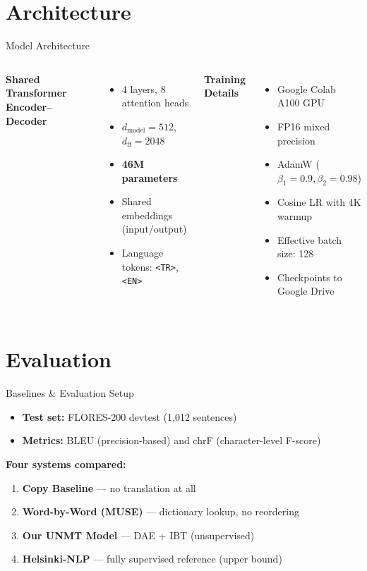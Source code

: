 \documentclass[aspectratio=169]{beamer}
\begin{document}
\section{Architecture}

\begin{frame}{Model Architecture}
  \begin{columns}
    \textbf{Shared Transformer Encoder--Decoder}
    \begin{itemize}
      \item 4 layers, 8 attention heads
      \item $d_{\text{model}} = 512$, $d_{\text{ff}} = 2048$
      \item \textbf{46M parameters}
      \item Shared embeddings (input/output)
      \item Language tokens: \texttt{<TR>}, \texttt{<EN>}
    \end{itemize}
    \textbf{Training Details}
    \begin{itemize}
      \item Google Colab A100 GPU
      \item FP16 mixed precision
      \item AdamW ($\beta_1\!=\!0.9, \beta_2\!=\!0.98$)
      \item Cosine LR with 4K warmup
      \item Effective batch size: 128
      \item Checkpoints to Google Drive
    \end{itemize}
  \end{columns}
\end{frame}

\section{Evaluation}

\begin{frame}{Baselines \& Evaluation Setup}
  \begin{itemize}
    \item \textbf{Test set:} FLORES-200 devtest (1,012 sentences)
    \item \textbf{Metrics:} BLEU (precision-based) and chrF (character-level F-score)
  \end{itemize}
  \vfill
  \textbf{Four systems compared:}
  \begin{enumerate}
    \item \textbf{Copy Baseline} — no translation at all
    \item \textbf{Word-by-Word (MUSE)} — dictionary lookup, no reordering
    \item \textbf{Our UNMT Model} — DAE + IBT (unsupervised)
    \item \textbf{Helsinki-NLP} — fully supervised reference (upper bound)
  \end{enumerate}
\end{frame}
\end{document}

